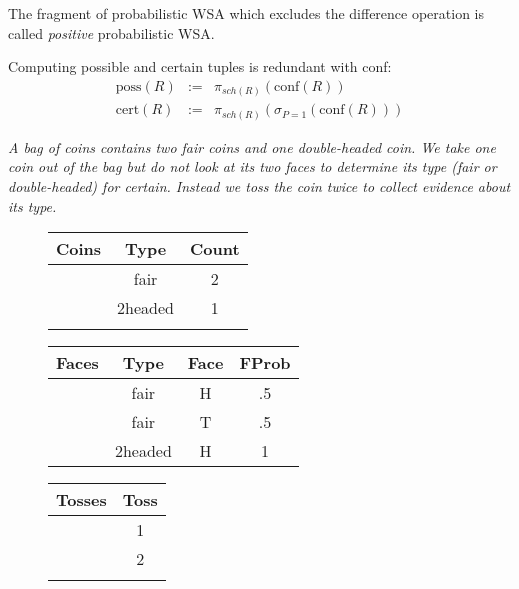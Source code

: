 The fragment of probabilistic WSA which excludes the difference operation is called
{\em positive}\/ probabilistic WSA.


Computing possible and certain tuples is redundant with conf:
\begin{eqnarray*}
\mbox{poss}(R) &:=&
\pi_{sch(R)}(\mbox{conf}(R))
\\
\mbox{cert}(R) &:=& \pi_{sch(R)}(\sigma_{P=1}(\mbox{conf}(R)))
\end{eqnarray*}



\begin{example}\em
\label{ex:twotosses}
A bag of coins contains two fair coins and one double-headed coin. We take one coin out of the bag but do not look at its two faces to determine its type (fair or double-headed) for certain. Instead we toss the coin twice to collect evidence about its type.


\begin{figure}
\begin{center}
\begin{tabular}{@{~}c|c@{~}c@{~}}
\hline
Coins & Type & Count \\
\hline
 & fair         & 2 \\
 & 2headed & 1 \\
\\
\end{tabular}
\hspace{2mm}
\begin{tabular}{@{~}c|ccc@{~}}
\hline
Faces & Type & Face & FProb \\
\hline
 & fair    & H & .5 \\
 & fair    & T & .5 \\
 & 2headed & H &  1 \\
\end{tabular}
\hspace{2mm}
\begin{tabular}{@{~}c|c@{~}}
\hline
Tosses & Toss \\
\hline
 & 1 \\
 & 2 \\
\\
\end{tabular}

\medskip


\end{center}
\end{figure}
\end{example}
